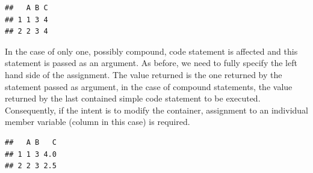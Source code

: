 \documentclass[krantz2]{krantz}\usepackage{knitr}%
\begin{document}
\begin{explainbox}
\begin{knitrout}\footnotesize
{}\color{fgcolor}\begin{kframe}
\begin{alltt}
\hlopt{$} \hlkwb{<-} 
\end{alltt}


{\ttfamily\noindent\itshape\color{messagecolor}{\#\# The following object is masked \_by\_ .GlobalEnv:\\\#\# \\\#\#\ \ \ \  A}}\begin{alltt}
\hlopt{$} \hlkwb{<-}  \hlopt{+}  \hlopt{/} 
 \hlstd{)}
\end{alltt}
\begin{verbatim}
##   A B C
## 1 1 3 4
## 2 2 3 4
\end{verbatim}
\end{kframe}
\end{knitrout}

In the case of  only one, possibly compound, code statement is affected and this statement is passed as an argument. As before, we need to fully specify the left hand side of the assignment. The value returned is the one returned by the statement passed as argument, in the case of compound statements, the value returned by the last contained simple code statement to be executed. Consequently, if the intent is to modify the container, assignment to an individual member variable (column in this case) is required.

\begin{knitrout}\footnotesize
{}\color{fgcolor}\begin{kframe}
\begin{alltt}
\hlopt{$} \hlkwb{<-} 
\hlopt{$} \hlkwb{<-}  \hlopt{+}  \hlopt{/} 
 \hlstd{)}
\end{alltt}
\begin{verbatim}
##   A B   C
## 1 1 3 4.0
## 2 2 3 2.5
\end{verbatim}
\end{kframe}
\end{knitrout}


\end{explainbox}
\end{document}
